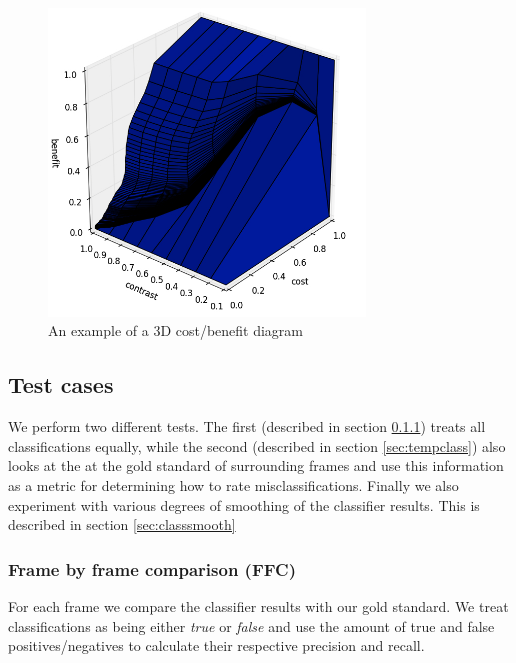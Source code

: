 %
\begin{figure}
     \centering
     \includegraphics[width=0.75\textwidth]{img/3dcostbenefitexample.jpg}
     \caption{An example of a 3D cost/benefit diagram}
     \label{fig:3dcostbenefitdiagram}
\end{figure}
%
\subsection{Test cases}\label{sec:testcases}
%
We perform two different tests. The first (described in section \ref{sec:fbfclass}) treats all classifications equally, while the second (described in section \ref{sec:tempclass}) also looks at the at the gold standard of surrounding frames and use this information as a metric for determining how to rate misclassifications. Finally we also experiment with various degrees of smoothing of the classifier results. This is described in section \ref{sec:classsmooth}
%
\subsubsection{Frame by frame comparison (FFC)}\label{sec:fbfclass}
%
For each frame we compare the classifier results with our gold standard. We treat classifications as being either \textit{true} or \textit{false} and use the amount of true and false positives/negatives to calculate their respective precision and recall.
%
